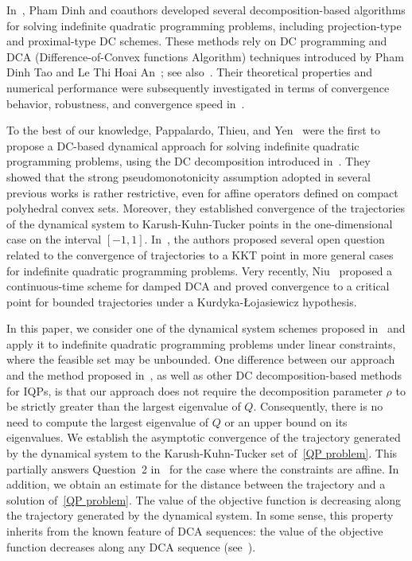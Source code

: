 \documentclass[11pt]{article}
\theoremstyle{definition}
\theoremstyle{remark}
\begin{document}
In~\cite{PhamDinh_LeThi_Akoa}, Pham Dinh and coauthors developed several decomposition-based algorithms for solving indefinite quadratic programming problems, including projection-type and proximal-type DC schemes. These methods rely on DC programming and DCA (Difference-of-Convex functions Algorithm) techniques introduced by Pham Dinh Tao and Le Thi Hoai An~\cite{PhamDinh_LeThi_AMV97,PhamDinh_LeThi98}; see also~\cite{LeThi_PhamDinh_AOR05,PhamDinh_LeThi_4}. Their theoretical properties and numerical performance were subsequently investigated in terms of convergence behavior, robustness, and convergence speed in~\cite{ATY2,CLY_2024,Tuan_JMAA2015,Tuan_JOTA2015}.

To the best of our knowledge, Pappalardo, Thieu, and Yen~\cite{pty_2025} were the first to propose a DC-based dynamical approach for solving indefinite quadratic programming problems, using the DC decomposition introduced in~\cite{CLY_2024}. They showed that the strong pseudomonotonicity assumption adopted in several previous works is rather restrictive, even for affine operators defined on compact polyhedral convex sets. Moreover, they established convergence of the trajectories of the dynamical system to Karush-Kuhn-Tucker points in the one-dimensional case on the interval $[-1,1]$. In~\cite{pty_2025}, the authors proposed several open question related to the convergence of trajectories to a KKT point in more general cases for indefinite quadratic programming problems. Very recently, Niu~\cite{N_2026} proposed a continuous-time scheme for damped DCA and proved convergence to a critical point for bounded trajectories under a Kurdyka-\L{}ojasiewicz hypothesis.

In this paper, we consider one of the dynamical system schemes proposed in~\cite{pty_2025} and apply it to indefinite quadratic programming problems under linear constraints, where the feasible set may be unbounded. One difference between our approach and the method proposed in~\cite{pty_2025}, as well as other DC decomposition-based methods~\cite{PhamDinh_LeThi_AMV97,PhamDinh_LeThi98} for IQPs, is that our approach does not require the decomposition parameter $\rho$ to be strictly greater than the largest eigenvalue of $Q$. Consequently, there is no need to compute the largest eigenvalue of $Q$ or an upper bound on its eigenvalues. We establish the asymptotic convergence of the trajectory
generated by the dynamical system to the Karush-Kuhn-Tucker set of~\eqref{QP problem}. This partially answers Question~2 in~\cite{pty_2025} for the case where the constraints are affine. In addition, we obtain an estimate for the distance between the trajectory and a solution of~\eqref{QP problem}. The value of the objective function is decreasing along the trajectory generated by the dynamical system. In some sense, this property inherits from the known feature of DCA sequences: the value of the objective function decreases along any DCA sequence (see~\cite{PhamDinh_LeThi_AMV97,PhamDinh_LeThi98}).
\end{document}

